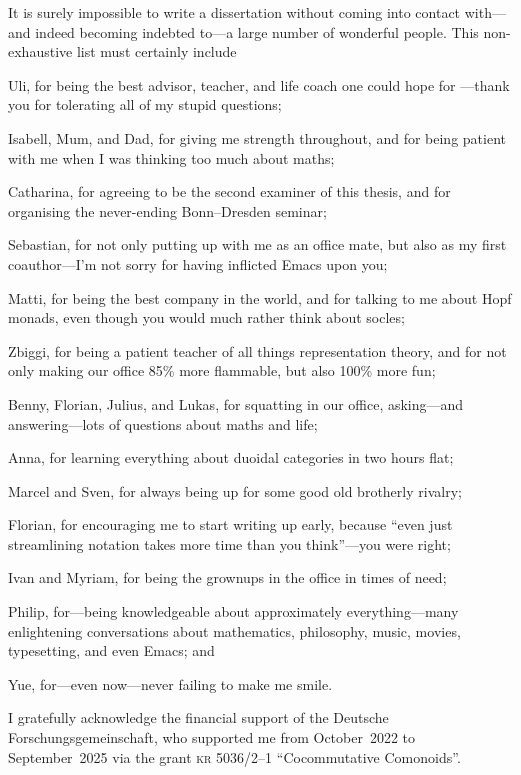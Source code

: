 It is surely impossible to write a dissertation
without coming into contact with—and indeed becoming indebted to—a large number of wonderful people.
This non-exhaustive list must certainly include

Uli, for being the best advisor, teacher, and life coach one could hope for%
—thank you for tolerating all of my stupid questions;

Isabell,
Mum,
and Dad,
for giving me strength throughout,
and for being patient with me when I was thinking too much about maths;

Catharina, for agreeing to be the second examiner of this thesis,
and for organising the never-ending Bonn--Dresden seminar;

Sebastian,
for not only putting up with me as an office mate,
but also as my first coauthor—I'm not sorry for having inflicted Emacs upon you;

Matti,
for being the best company in the world,
and for talking to me about Hopf monads,
even though you would much rather think about socles;

Zbiggi,
for being a patient teacher of all things representation theory,
and for not only making our office 85\% more flammable,
but also 100\% more fun;

Benny, Florian, Julius, and Lukas, for squatting in our office,
asking—and answering—lots of questions about maths and life;

Anna, for learning everything about duoidal categories in two hours flat;

Marcel and Sven, for always being up for some good old brotherly rivalry;

Florian, for encouraging me to start writing up early,
because ``even just streamlining notation takes more time than you think''—you were right;

Ivan and Myriam, for being the grownups in the office in times of need;

Philip,
for—being knowledgeable about approximately everything—many
enlightening conversations about mathematics, philosophy, music, movies, typesetting, and even Emacs; and

Yue, for—even now—never failing to make me smile.

\bigskip%
I gratefully acknowledge the financial support of the Deutsche Forschungsgemeinschaft,
who supported me from October~2022 to September~2025 via the grant
\textsc{kr} 5036/2--1 ``Cocommutative Comonoids''.

